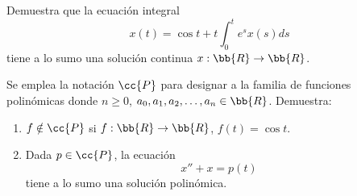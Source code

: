 \documentclass[12pt]{article}
\begin{document}
    \begin{ejercicio}
        Demuestra que la ecuación integral
        \begin{equation*}
            x(t)=\cos t+t\int_0^t e^{s}x(s)ds
        \end{equation*}
        tiene a lo sumo una solución continua $x:\bb{R}\to\bb{R}$.
    \end{ejercicio}

    \begin{ejercicio}
        Se emplea la notación $\cc{P}$ para designar a la familia de funciones polinómicas
        donde $n\geq 0$, $a_0,a_1,a_2,\ldots,a_n\in\bb{R}$. Demuestra:
        \begin{enumerate}
            \item $f\notin \cc{P}$ si $f:\bb{R}\to\bb{R}$, $f(t)=\cos t$.
            \item Dada $p\in \cc{P}$, la ecuación
            \begin{equation*}
                x''+x=p(t)
            \end{equation*}
            tiene a lo sumo una solución polinómica.
        \end{enumerate}
    \end{ejercicio}
    \newpage
    \setcounter{ejercicio}{0} %
\end{document}
